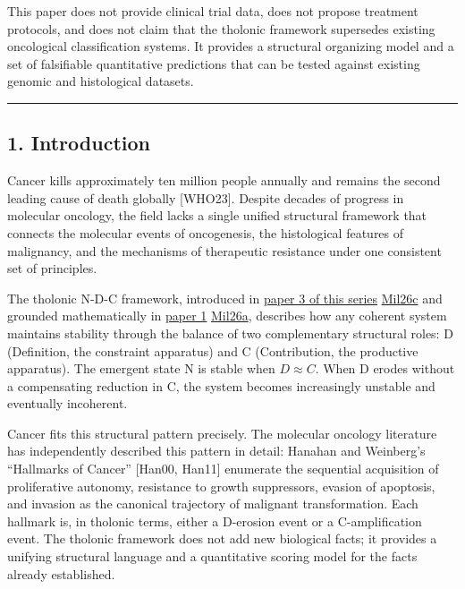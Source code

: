 \documentclass[
  11pt,
  letterpaper,
]{article}
\begin{document}
This paper does not provide clinical trial data, does not propose
treatment protocols, and does not claim that the tholonic framework
supersedes existing oncological classification systems. It provides a
structural organizing model and a set of falsifiable quantitative
predictions that can be tested against existing genomic and histological
datasets.

\begin{center}\rule{0.5\linewidth}{0.5pt}\end{center}

\subsection{1. Introduction}\label{introduction}

Cancer kills approximately ten million people annually and remains the
second leading cause of death globally {[}WHO23{]}. Despite decades of
progress in molecular oncology, the field lacks a single unified
structural framework that connects the molecular events of oncogenesis,
the histological features of malignancy, and the mechanisms of
therapeutic resistance under one consistent set of principles.

The tholonic N-D-C framework, introduced in
\href{https://github.com/baardev/truevalue/blob/main/docnav/Research/papers/3_minimal-recursive-triadic-framework/3_minimal-recursive-triadic-framework.pdf}{paper
3 of this series}
\href{https://github.com/baardev/truevalue/blob/main/docnav/Research/papers/3_minimal-recursive-triadic-framework/3_minimal-recursive-triadic-framework.pdf}{Mil26c}
and grounded mathematically in
\href{https://github.com/baardev/truevalue/blob/main/docnav/Research/papers/1_recursive-tholonic-five-constants/1_recursive-tholonic-five-constants.pdf}{paper
1}
\href{https://github.com/baardev/truevalue/blob/main/docnav/Research/papers/1_recursive-tholonic-five-constants/1_recursive-tholonic-five-constants.pdf}{Mil26a},
describes how any coherent system maintains stability through the
balance of two complementary structural roles: D (Definition, the
constraint apparatus) and C (Contribution, the productive apparatus).
The emergent state N is stable when \(D \approx C\). When D erodes
without a compensating reduction in C, the system becomes increasingly
unstable and eventually incoherent.

Cancer fits this structural pattern precisely. The molecular oncology
literature has independently described this pattern in detail: Hanahan
and Weinberg's ``Hallmarks of Cancer'' {[}Han00, Han11{]} enumerate the
sequential acquisition of proliferative autonomy, resistance to growth
suppressors, evasion of apoptosis, and invasion as the canonical
trajectory of malignant transformation. Each hallmark is, in tholonic
terms, either a D-erosion event or a C-amplification event. The tholonic
framework does not add new biological facts; it provides a unifying
structural language and a quantitative scoring model for the facts
already established.
\end{document}

